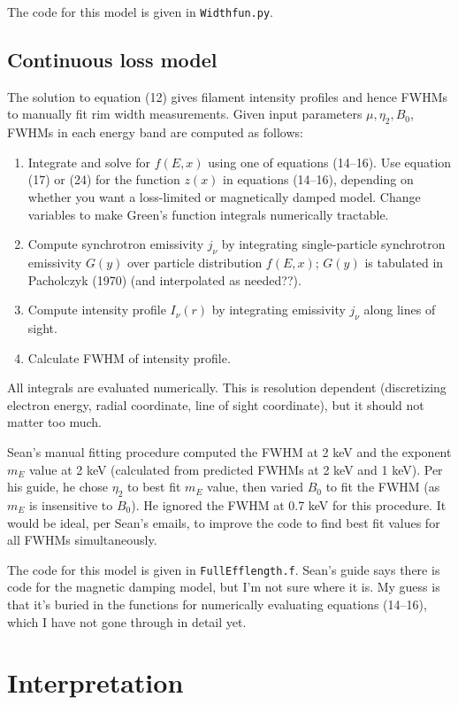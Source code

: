 \documentclass[10pt]{article}
\begin{document}
The code for this model is given in {\tt{Widthfun.py}}.

\subsection{Continuous loss model}

The solution to equation (12) gives filament intensity profiles and hence FWHMs
to manually fit rim width measurements.  Given input parameters $\mu, \eta_2,
B_0$, FWHMs in each energy band are computed as follows:
\begin{enumerate}
  \item Integrate and solve for $f(E,x)$ using one of equations (14--16).
    Use equation (17) or (24) for the function $z(x)$ in equations (14--16),
    depending on whether you want a loss-limited or magnetically damped model.
    Change variables to make Green's function integrals numerically tractable.
  \item Compute synchrotron emissivity $j_\nu$ by integrating single-particle
    synchrotron emissivity $G(y)$ over particle distribution $f(E,x)$;
    $G(y)$ is tabulated in Pacholczyk (1970) (and interpolated as needed??).
  \item Compute intensity profile $I_\nu(r)$ by integrating emissivity $j_\nu$
    along lines of sight.
  \item Calculate FWHM of intensity profile.
\end{enumerate}
All integrals are evaluated numerically. This is resolution dependent
(discretizing electron energy, radial coordinate, line of sight coordinate),
but it should not matter too much.

Sean's manual fitting procedure computed the FWHM at 2 keV and the exponent
$m_E$ value at 2 keV (calculated from predicted FWHMs at 2 keV and 1 keV).
Per his guide, he chose $\eta_2$ to best fit $m_E$ value, then varied $B_0$ to
fit the FWHM (as $m_E$ is insensitive to $B_0$).  He ignored the FWHM at 0.7
keV for this procedure.  It would be ideal, per Sean's emails, to improve the
code to find best fit values for all FWHMs simultaneously.

The code for this model is given in {\tt{FullEfflength.f}}.  Sean's guide says
there is code for the magnetic damping model, but I'm not sure where it is.  My
guess is that it's buried in the functions for numerically evaluating equations
(14--16), which I have not gone through in detail yet.

\section{Interpretation}
\end{document}
